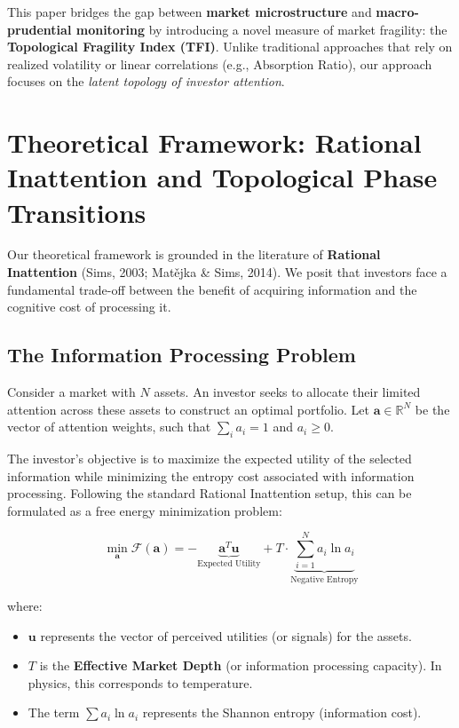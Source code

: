 \documentclass[preprint,12pt]{elsarticle}
\begin{document}
This paper bridges the gap between \textbf{market microstructure} and \textbf{macro-prudential monitoring} by introducing a novel measure of market fragility: the \textbf{Topological Fragility Index (TFI)}. Unlike traditional approaches that rely on realized volatility or linear correlations (e.g., Absorption Ratio), our approach focuses on the \textit{latent topology of investor attention}.

\section{Theoretical Framework: Rational Inattention and Topological Phase Transitions}
\label{sec:theory}

Our theoretical framework is grounded in the literature of \textbf{Rational Inattention} (Sims, 2003; Matějka \& Sims, 2014). We posit that investors face a fundamental trade-off between the benefit of acquiring information and the cognitive cost of processing it.

\subsection{The Information Processing Problem}
Consider a market with $N$ assets. An investor seeks to allocate their limited attention across these assets to construct an optimal portfolio. Let $\mathbf{a} \in \mathbb{R}^N$ be the vector of attention weights, such that $\sum_i a_i = 1$ and $a_i \ge 0$.

The investor's objective is to maximize the expected utility of the selected information while minimizing the entropy cost associated with information processing. Following the standard Rational Inattention setup, this can be formulated as a free energy minimization problem:

\begin{equation}
    \min_{\mathbf{a}} \mathcal{F}(\mathbf{a}) = -\underbrace{\mathbf{a}^T \mathbf{u}}_{\text{Expected Utility}} + T \cdot \underbrace{\sum_{i=1}^N a_i \ln a_i}_{\text{Negative Entropy}}
\end{equation}

where:
\begin{itemize}
    \item $\mathbf{u}$ represents the vector of perceived utilities (or signals) for the assets.
    \item $T$ is the \textbf{Effective Market Depth} (or information processing capacity). In physics, this corresponds to temperature.
    \item The term $\sum a_i \ln a_i$ represents the Shannon entropy (information cost).
\end{itemize}
\end{document}
